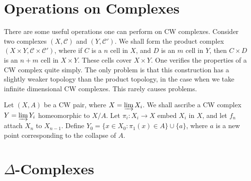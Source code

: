 \section{Operations on Complexes}

There are some useful operations one can perform on CW complexes. Consider two complexes $(X,\mathcal{C})$ and $(Y,\mathcal{C}')$. We shall form the product complex $(X \times Y, \mathcal{C} \times \mathcal{C}')$, where if $C$ is a $n$ cell in $X$, and $D$ is an $m$ cell in $Y$, then $C \times D$ is an $n + m$ cell in $X \times Y$. These cells cover $X \times Y$. One verifies the properties of a CW complex quite simply. The only problem is that this construction has a slightly weaker topology than the product topology, in the case when we take infinite dimensional CW complexes. This rarely causes problems.

Let $(X,A)$ be a CW pair, where $X = \varinjlim X_i$. We shall ascribe a CW complex $Y = \varinjlim Y_i$ homeomorphic to $X/A$. Let $\pi_i: X_i \to X$ embed $X_i$ in $X$, and let $f_n$ attach $X_n$ to $X_{n-1}$. Define $Y_0 = \{ x \in X_0 : \pi_1(x) \in A \} \cup \{ a \}$, where $a$ is a new point corresponding to the collapse of $A$.

\section{$\Delta$-Complexes}

